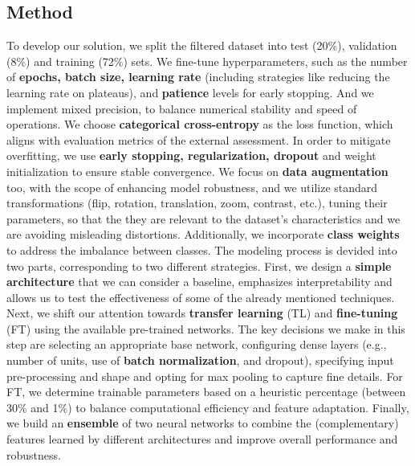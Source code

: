 \documentclass[11pt]{template}
\begin{document}
\begin{multicols}{2}
\section{Method}
To develop our solution, we split the filtered dataset into test (20\%), validation (8\%) and training (72\%) sets. We fine-tune hyperparameters, such as the number of \textbf{epochs, batch size, learning rate} (including strategies like reducing the learning rate on plateaus), and \textbf{patience} levels for early stopping. And we implement mixed precision, to balance numerical stability and speed of operations. 
We choose \textbf{categorical cross-entropy} as the loss function, which aligns with evaluation metrics of the external assessment. In order to mitigate overfitting, we use \textbf{early stopping, regularization, dropout} and weight initialization to ensure stable convergence.
We focus on \textbf{data augmentation} too, with the scope of enhancing model robustness, and we utilize standard transformations (flip, rotation, translation, zoom, contrast, etc.), tuning their parameters, so that the they are relevant to the dataset's characteristics and we are avoiding misleading distortions. Additionally, we incorporate \textbf{class weights} to address the imbalance between classes.
The modeling process is devided into two parts, corresponding to two different strategies. First, we design a \textbf{simple architecture} that we can consider a baseline, emphasizes interpretability and allows us to test the effectiveness of some of the already mentioned techniques. Next, we shift our attention towards \textbf{transfer learning} (TL) and \textbf{fine-tuning} (FT) using the available pre-trained networks. The key decisions we make in this step are selecting an appropriate base network, configuring dense layers (e.g., number of units, use of \textbf{batch normalization}, and dropout), specifying input pre-processing and shape and opting for max pooling to capture fine details. For FT, we determine trainable parameters based on a heuristic percentage (between 30\% and 1\%) to balance computational efficiency and feature adaptation.
Finally, we build an \textbf{ensemble} of two neural networks to combine the (complementary) features learned by different architectures and improve overall performance and robustness.


\end{multicols}
\end{document}
